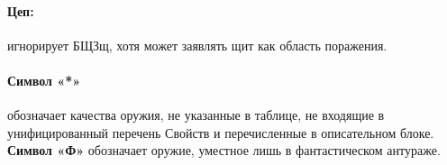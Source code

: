 \paragraph{Цеп:} игнорирует БЩЗщ, хотя может заявлять щит как область поражения.
\paragraph{Символ «*»} обозначает качества оружия, не указанные в таблице, не входящие в унифицированный перечень Свойств и перечисленные в описательном блоке. \textbf{Символ «Ф»} обозначает оружие, уместное лишь в фантастическом антураже.